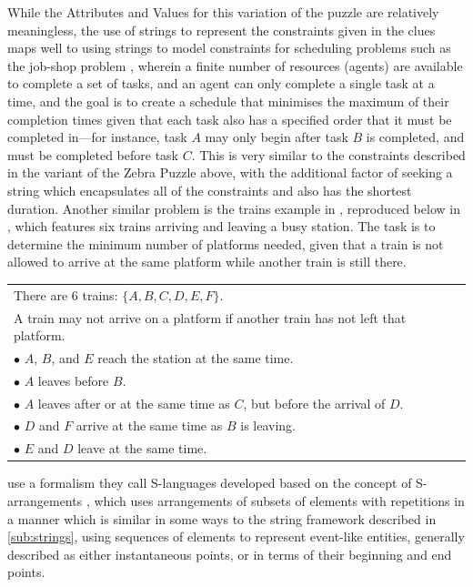 \documentclass[a4paper,12pt,leqno]{article}
\begin{document}
While the Attributes and Values for this variation of the puzzle are relatively meaningless, the use of strings to represent the constraints given in the clues maps well to using strings to model constraints for scheduling problems such as the job-shop problem \citep{manne1960job,applegate1991computational}, wherein a finite number of resources (agents) are available to complete a set of tasks, and an agent can only complete a single task at a time, and the goal is to create a schedule that minimises the maximum of their completion times given that each task also has a specified order that it must be completed in---for instance, task $A$ may only begin after task $B$ is completed, and must be completed before task $C$. This is very similar to the constraints described in the variant of the Zebra Puzzle above, with the additional factor of seeking a string which encapsulates all of the constraints and also has the shortest duration. Another similar problem is the trains example in \citet{durand2008tool}, reproduced below in , which features six trains arriving and leaving a busy station. The task is to determine the minimum number of platforms needed, given that a train is not allowed to arrive at the same platform while another train is still there.
\begin{center}
	\begin{tabular}[h!]{|l|}
		\hline
		There are 6 trains: $\{A,B,C,D,E,F\}$.\\
		A train may not arrive on a platform if another train has not left that platform.\\
		$\bullet$ $A$, $B$, and $E$ reach the station at the same time.\\
		$\bullet$ $A$ leaves before $B$.\\
		$\bullet$ $A$ leaves after or at the same time as $C$, but before the arrival of $D$.\\
		$\bullet$ $D$ and $F$ arrive at the same time as $B$ is leaving.\\
		$\bullet$ $E$ and $D$ leave at the same time.\\
		\hline
	\end{tabular}
	\label{tab:train-problem-clues}
\end{center}
\citet[p. 3298]{durand2008tool} use a formalism they call S-languages developed based on the concept of S-arrangements \citep{schwer2002s}, which uses arrangements of subsets of elements with repetitions in a manner which is similar in some ways to the string framework described in \cref{sub:strings}, using sequences of elements to represent event-like entities, generally described as either instantaneous points, or in terms of their beginning and end points.
\end{document}
